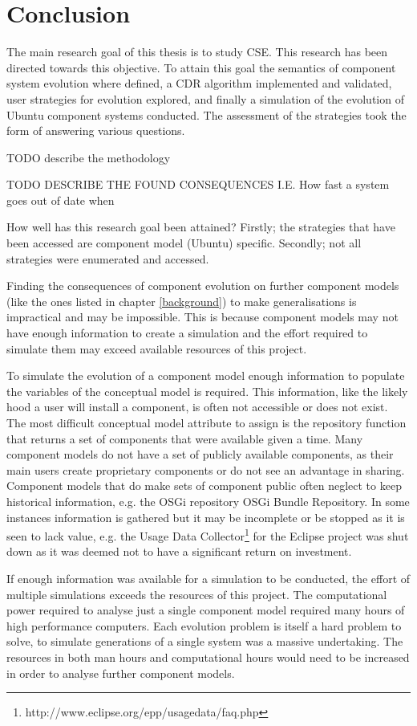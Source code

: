 \chapter{Conclusion}
\label{conclusion}
The main research goal of this thesis is to study CSE.
This research has been directed towards this objective.
To attain this goal the semantics of component system evolution where defined, a CDR algorithm implemented and validated, user strategies for evolution explored,
and finally a simulation of the evolution of Ubuntu component systems conducted.
The assessment of the strategies took the form of answering various questions.

TODO describe the methodology


TODO DESCRIBE THE FOUND CONSEQUENCES I.E. How fast a system goes out of date when

How well has this research goal been attained?
Firstly; the strategies that have been accessed are component model (Ubuntu) specific. 
Secondly; not all strategies were enumerated and accessed.

Finding the consequences of component evolution on further component models (like the ones listed in chapter \ref{background}) to make generalisations is impractical and may be impossible.
This is because component models may not have enough information to create a simulation and the effort required to simulate them may exceed available resources of this project.

To simulate the evolution of a component model enough information to populate the variables of the conceptual model is required.
This information, like the likely hood a user will install a component, is often not accessible or does not exist.
The most difficult conceptual model attribute to assign is the repository function that returns a set of components that were available given a time. 
Many component models do not have a set of publicly available components, as their main users create proprietary components or do not see an advantage in sharing.
Component models that do make sets of component public often neglect to keep historical information, e.g. the OSGi repository OSGi Bundle Repository.
In some instances information is gathered but it may be incomplete or be stopped as it is seen to lack value,  
e.g. the Usage Data Collector\footnote{http://www.eclipse.org/epp/usagedata/faq.php} for the Eclipse project was shut down as it was deemed not to have a significant return on investment.  

If enough information was available for a simulation to be conducted, the effort of multiple simulations exceeds the resources of this project.
The computational power required to analyse just a single component model required many hours of high performance computers.
Each evolution problem is itself a hard problem to solve, to simulate generations of a single system was a massive undertaking.
The resources in both man hours and computational hours would need to be increased in order to analyse further component models.

